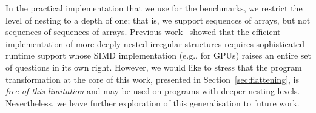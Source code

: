 In the practical implementation that we use for the benchmarks, we restrict the level of nesting to a depth of one; that is, we support sequences of arrays, but not sequences of sequences of arrays. Previous work~\citep{Lippmeier:replicate} showed that the efficient implementation of more deeply nested irregular structures requires sophisticated runtime support whose SIMD implementation (e.g., for GPUs) raises an entire set of questions in its own right. However, we would like to stress that the program transformation at the core of this work, presented in Section~\ref{sec:flattening}, is \emph{free of this limitation} and may be used on programs with deeper nesting levels. Nevertheless, we leave further exploration of this generalisation to future work.



%
%

